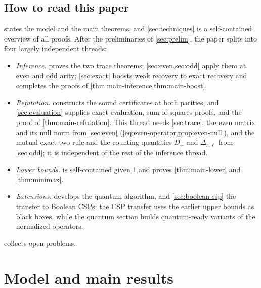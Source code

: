 \documentclass[11pt]{article}
\theoremstyle{definition}
\theoremstyle{remark}
\newcommand{\1}{\mathbf 1}
\numberwithin{equation}{section}
\begin{document}
\subsection{How to read this paper}\label{sec:reading}

 states the model and the main theorems, and
\cref{sec:techniques} is a self-contained overview of all proofs.  After
the preliminaries of \cref{sec:prelim}, the paper splits into four
largely independent threads:
\begin{itemize}
\item\emph{Inference.}   proves the two trace theorems;
\cref{sec:even,sec:odd} apply them at even and odd arity;
\cref{sec:exact} boosts weak recovery to exact recovery and completes
the proofs of \cref{thm:main-inference,thm:main-boost}.
\item\emph{Refutation.}   constructs the sound
certificates at both parities, and \cref{sec:evaluation} supplies exact
evaluation, sum-of-squares proofs, and the proof of
\cref{thm:main-refutation}.  This thread needs \cref{sec:trace}, the
even matrix and its null norm from \cref{sec:even}
(\cref{eq:even-operator,prop:even-null}), and the mutual exact-two rule
and the counting quantities $D_+$ and $\Delta_{r,\ell}$ from
\cref{sec:odd}; it is independent of the rest of the inference thread.
\item\emph{Lower bounds.}   is self-contained given
\cref{sec:results} and proves \cref{thm:main-lower} and
\cref{thm:minimax}.
\item\emph{Extensions.}   develops the quantum
algorithm, and \cref{sec:boolean-csp} the transfer to Boolean CSPs;
the CSP transfer uses the earlier upper bounds as black boxes, while
the quantum section builds quantum-ready variants of the normalized
operators.
\end{itemize}
 collects open problems.


\section{Model and main results}\label{sec:results}
\end{document}
